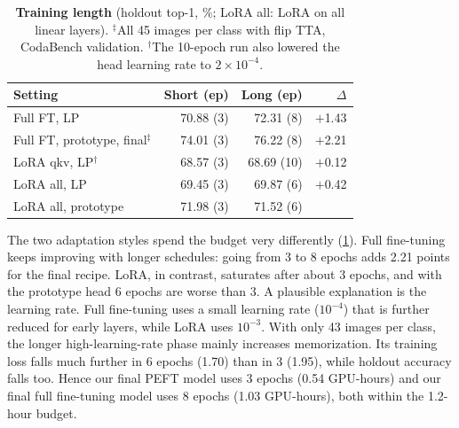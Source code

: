 \begin{table}[t]
  \centering
  \footnotesize
  \setlength{\tabcolsep}{3.5pt}
  \begin{tabular}{@{}lrrr@{}}
    \toprule
    Setting & Short (ep) & Long (ep) & $\Delta$ \\
    \midrule
    Full FT, LP & 70.88 (3) & 72.31 (8) & $+$1.43 \\
    Full FT, prototype, final$^\ddagger$ & 74.01 (3) & 76.22 (8) & $+$2.21 \\
    LoRA qkv, LP$^\dagger$ & 68.57 (3) & 68.69 (10) & $+$0.12 \\
    LoRA all, LP & 69.45 (3) & 69.87 (6) & $+$0.42 \\
    LoRA all, prototype & 71.98 (3) & 71.52 (6) & \minus0.46 \\
    \bottomrule
  \end{tabular}
  \caption{\textbf{Training length} (holdout top-1, \%; LoRA all: LoRA on all linear layers).
  $^\ddagger$All 45 images per class with flip TTA, CodaBench validation.
  $^\dagger$The 10-epoch run also lowered the head learning rate to $2{\times}10^{-4}$.}
  \label{tab:length}
\end{table}

The two adaptation styles spend the budget very differently (\cref{tab:length}).
Full fine-tuning keeps improving with longer schedules: going from 3 to 8 epochs adds 2.21 points for the final recipe.
LoRA, in contrast, saturates after about 3 epochs, and with the prototype head 6 epochs are worse than 3.
A plausible explanation is the learning rate.
Full fine-tuning uses a small learning rate ($10^{-4}$) that is further reduced for early layers, while LoRA uses $10^{-3}$.
With only 43 images per class, the longer high-learning-rate phase mainly increases memorization.
Its training loss falls much further in 6 epochs (1.70) than in 3 (1.95), while holdout accuracy falls too.
Hence our final PEFT model uses 3 epochs (0.54 GPU-hours) and our final full fine-tuning model uses 8 epochs (1.03 GPU-hours), both within the 1.2-hour budget.
